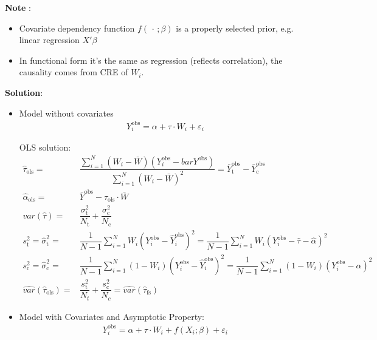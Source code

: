 \textbf{Note} :
\begin{itemize}[topsep=2pt,itemsep=0pt]
    \item Covariate dependency function $ f(\, \cdot \, ;\beta ) $ is a properly selected prior, e.g. linear regression $ X'\beta  $
    \item In functional form it's the same as regression (reflects correlation), the causality comes from CRE of $ W_i $.
\end{itemize}

\textbf{Solution}:
\begin{itemize}[topsep=2pt,itemsep=0pt]
    \item Model without covariates
    \begin{align}
        Y_i^\mathrm{obs} = \alpha +\tau\cdot W_i+\varepsilon _i  
    \end{align}

    OLS solution:
    \begin{align}
        \hat{\tau}_\mathrm{ols} =&\dfrac{\sum_{i=1}^N(W_i-\bar{W})(Y_i^\mathrm{obs}-bar{Y}^\mathrm{obs}  )}{\sum_{i=1}^N(W_i-\bar{W})^2}=\bar{Y}^\mathrm{obs}_\mathrm{t}-\bar{Y}^\mathrm{obs}_\mathrm{c}   \\
        \hat{\alpha }_\mathrm{ols} =&\bar{Y}^\mathrm{obs}-\hat{\tau}_\mathrm{ols} \cdot\bar{W}  \\
        var(\hat{\tau})=&\dfrac{\sigma _\mathrm{t}^2 }{N_\mathrm{t} }+\dfrac{\sigma _\mathrm{c}^2 }{N_\mathrm{c} }\\
        s^2_\mathrm{t}= \hat{\sigma }_\mathrm{t}^2=&\dfrac{1}{N-1}\sum_{i=1}^NW_i\left(Y_i^\mathrm{obs}-\hat{Y}_i^\mathrm{obs}  \right)^2=\dfrac{1}{N-1}\sum_{i=1}^NW_i\left(Y_i^\mathrm{obs}-\hat{\tau}-\hat{\alpha } \right)^2\\
        s_\mathrm{c}^2= \hat{\sigma }_\mathrm{c}^2=&\dfrac{1}{N-1}\sum_{i=1}^N(1-W_i)\left(Y_i^\mathrm{obs}-\hat{Y}_i^\mathrm{obs}  \right)^2=\dfrac{1}{N-1}\sum_{i=1}^N(1-W_i)\left(Y_i^\mathrm{obs}-\hat{\alpha } \right)^2\\
        \hat{var}(\hat{\tau}_\mathrm{ols} )=&\dfrac{s_\mathrm{t}^2 }{N_t}+\dfrac{s_\mathrm{c}^2 }{N_c}=\hat{var}(\hat{\tau}_\mathrm{fs} )
    \end{align}
    
    \item Model with Covariates and Asymptotic Property:
    \begin{align}
        Y_i^\mathrm{obs} = \alpha +\tau\cdot W_i +f(X_i;\beta)  +\varepsilon _i 
    \end{align}


\end{itemize}

